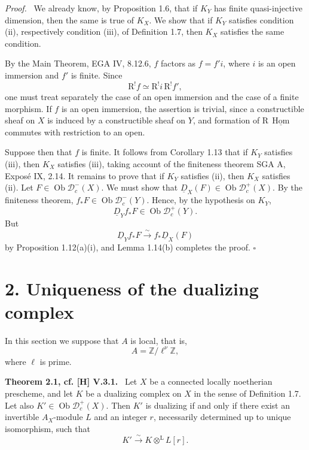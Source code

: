 \documentclass[11pt]{article}
\theoremstyle{plain}
\theoremstyle{definition}
\theoremstyle{remark}
\newenvironment{statement}[1]{\par\medskip\noindent\textbf{#1.}\ }{\par\medskip}
\newenvironment{prooftext}{\par\noindent\textit{Proof.}\ }{\par\medskip}
\newcommand{\ZZ}{\mathbb Z}
\newcommand{\D}{\mathcal D}\newcommand{\E}{\mathcal E}\newcommand{\F}{\mathcal F}
\DeclareMathOperator{\Hom}{Hom}
\DeclareMathOperator{\ob}{Ob}
\newcommand{\R}{\mathrm R}
\newcommand{\qedtext}{\hfill$\square$}
\begin{document}
\begin{prooftext}
We already know, by Proposition 1.6, that if $K_Y$ has finite quasi-injective dimension, then the same is true of $K_X$. We show that if $K_Y$ satisfies condition (ii), respectively condition (iii), of Definition 1.7, then $K_X$ satisfies the same condition.

By the Main Theorem, EGA IV, 8.12.6, $f$ factors as $f=f'i$, where $i$ is an open immersion and $f'$ is finite. Since
\[
   \R^!f\simeq\R^!i\,\R^!f',
\]
one must treat separately the case of an open immersion and the case of a finite morphism. If $f$ is an open immersion, the assertion is trivial, since a constructible sheaf on $X$ is induced by a constructible sheaf on $Y$, and formation of $\R\,\underline{\Hom}$ commutes with restriction to an open.

Suppose then that $f$ is finite. It follows from Corollary 1.13 that if $K_Y$ satisfies (iii), then $K_X$ satisfies (iii), taking account of the finiteness theorem SGA A, Exposé IX, 2.14. It remains to prove that if $K_Y$ satisfies (ii), then $K_X$ satisfies (ii). Let $F\in\ob\D_c^-(X)$. We must show that $\underline D_X(F)\in\ob\D_c^+(X)$. By the finiteness theorem, $f_*F\in\ob\D_c^-(Y)$. Hence, by the hypothesis on $K_Y$,
\[
   \underline D_Y f_*F\in\ob\D_c^+(Y).
\]
But
\[
   \underline D_Y f_*F\xrightarrow{\sim}f_*\underline D_X(F)
\]
by Proposition 1.12(a)(i), and Lemma 1.14(b) completes the proof. \qedtext
\end{prooftext}

\section*{2. Uniqueness of the dualizing complex}

In this section we suppose that $A$ is local, that is,
\[
   A=\ZZ/\ell^\nu\ZZ,
\]
where $\ell$ is prime.

\begin{statement}{Theorem 2.1, cf. [H] V.3.1}
Let $X$ be a connected locally noetherian prescheme, and let $K$ be a dualizing complex on $X$ in the sense of Definition 1.7. Let also $K'\in\ob\D_c^+(X)$. Then $K'$ is dualizing if and only if there exist an invertible $A_X$-module $L$ and an integer $r$, necessarily determined up to unique isomorphism, such that
\[
   K'\xrightarrow{\sim}K\otimes^{\mathrm L}L[r].
\]
\end{statement}
\end{document}
